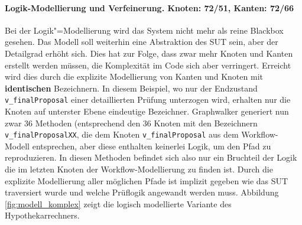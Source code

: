 \paragraph{Logik-Modellierung und Verfeinerung. Knoten: 72/51, Kanten: 72/66} Bei der Logik"=Modellierung wird das System nicht mehr als reine Blackbox gesehen. Das Modell soll weiterhin eine Abstraktion des \Gls{SUT} sein, aber der Detailgrad erhöht sich. Dies hat zur Folge, dass zwar mehr Knoten und Kanten erstellt werden müssen, die Komplexität im Code sich aber verringert. Erreicht wird dies durch die explizite Modellierung von Kanten und Knoten mit \textbf{identischen} Bezeichnern. In diesem Beispiel, wo nur der Endzustand \texttt{v\_finalProposal} einer detaillierten Prüfung unterzogen wird, erhalten nur die Knoten auf unterster Ebene eindeutige Bezeichner. Graphwalker generiert nun zwar 36 Methoden (entsprechend den 36 Knoten mit den Bezeichnern \texttt{v\_finalProposalXX}, die dem Knoten \texttt{v\_finalProposal} aus dem Workflow-Modell entsprechen, aber diese enthalten keinerlei Logik, um den Pfad zu reproduzieren. In diesen Methoden befindet sich also nur ein Bruchteil der Logik die im letzten Knoten der Workflow-Modellierung zu finden ist. Durch die explizite Modellierung aller möglichen Pfade ist implizit gegeben wie das \Gls{SUT} traversiert wurde und welche Prüflogik angewandt werden muss. Abbildung \ref{fig:modell_komplex} zeigt die logisch modellierte Variante des Hypothekarrechners.


